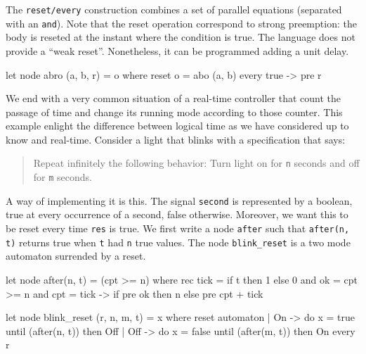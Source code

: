 \documentclass[11pt,titlepage,twoside]{report}
\begin{document}
The \verb-reset/every- construction combines a set of parallel
equations (separated with an \verb-and-). Note that the reset
operation correspond to strong preemption: the body is reseted at the
instant where the condition is true. The language does not provide a
``weak reset''. Nonetheless, it can be programmed adding a unit delay.

\begin{runverbatim}[withresult,include=abo]
  let node abro (a, b, r) = o where
    reset
      o = abo (a, b)
    every true -> pre r
\end{runverbatim}



We end with a very common situation of a real-time controller that count
the passage of time and change its running mode according to those counter. This
example enlight the difference between logical time as we have considered up to know
and real-time. Consider a light that
blinks with a specification that says:

\begin{quote}
  Repeat infinitely the following behavior:
  Turn light on for \texttt{n} seconds and off for
  \texttt{m} seconds.
\end{quote}

A way of implementing it is this. The signal \texttt{second} is
represented by a boolean, true at every occurrence of a second, false
otherwise. Moreover, we want this to be reset every time \texttt{res}
is true. We first write a node \texttt{after} such that
\texttt{after(n, t)} returns true when \texttt{t} had \texttt{n} true
values. The node \texttt{blink\_reset} is a two mode automaton
surrended by a reset.

\begin{runverbatim}[withresult,label=after,label=blink_reset]
let node after(n, t) = (cpt >= n) where
  rec tick = if t then 1 else 0
  and ok = cpt >= n
  and cpt = tick -> if pre ok then n else pre cpt + tick

let node blink_reset (r, n, m, t) = x where
 reset
   automaton
   | On  -> do x = true  until (after(n, t)) then Off
   | Off -> do x = false until (after(m, t)) then On
 every r
\end{runverbatim}
\end{document}
